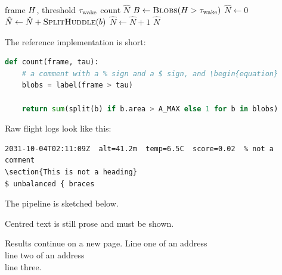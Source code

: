 \begin{algorithm}[t]
\caption{Counting warm bodies in one thermal frame}\label{alg:count}
\begin{algorithmic}[1]
\Require frame $H$, threshold $\tau_{\mathrm{wake}}$
\Ensure count $\hat{N}$
\State $B \gets \Call{Blobs}{\heat > \wake}$
\State $\hat{N} \gets 0$
   
    \State $\hat{N} \gets \hat{N} + \Call{SplitHuddle}{b}$
  \Else
    \State $\hat{N} \gets \hat{N} + 1$
  \EndIf
\EndFor
\State \Return $\hat{N}$
\end{algorithmic}
\end{algorithm}

The reference implementation is short:
\begin{lstlisting}[language=Python, caption={Blob counting: all of the logic}]
def count(frame, tau):
    # a comment with a % sign and a $ sign, and \begin{equation}
    blobs = label(frame > tau)

    return sum(split(b) if b.area > A_MAX else 1 for b in blobs)
\end{lstlisting}

Raw flight logs look like this:
\begin{verbatim}
2031-10-04T02:11:09Z  alt=41.2m  temp=6.5C  score=0.02  % not a comment
\section{This is not a heading}
$ unbalanced { braces
\end{verbatim}

The pipeline is sketched below.


\medskip
\begin{center}
Centred text is still prose and must be shown.
\end{center}

\newpage
Results continue on a new page. Line one of an address \\ line two of an address \\[4pt] line three.
\clearpage
